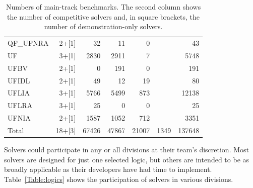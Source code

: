 \documentclass[twoside,11pt]{article}
\begin{document}
\begin{table}
\begin{tabular}{|l|r|r|r|r|r|r|}
QF\_UFNRA & 2+[1] & 32 & 11 & 0 & & 43\\
UF & 3+[1] & 2830 & 2911 & 7 & & 5748 \\
UFBV & 2+[1] & 0 & 191 & 0 & & 191 \\
UFIDL & 2+[1] & 49 & 12 & 19 & & 80 \\
UFLIA & 3+[1] & 5766 & 5499 & 873 & & 12138 \\
UFLRA & 3+[1] & 25 & 0 & 0 & & 25\\
UFNIA & 2+[1] & 1587 & 1052 & 712 & & 3351 \\
\hline
Total & 18+[3] & 67426 & 47867 & 21007 & 1349 & 137648 \\
\hline
\end{tabular}
\vspace{.2in}
\caption{Numbers of main-track benchmarks. The second column shows the number of competitive solvers and, in square brackets, the number of demonstration-only solvers.}
\label{Table:benchmarks}
\end{table}

Solvers could participate in any or all divisions at their team's discretion. Most solvers are designed for just one selected logic, but others are intended to be as broadly applicable as their developers have had time to implement. Table~\ref{Table:logics} shows the participation of solvers in various divisions.
\end{document}
